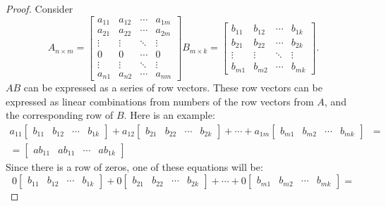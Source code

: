 \documentclass{article}
\begin{document}
\begin{question}{1.3}{}
{\begin{enumerate}
\begin{proof}
        Consider
        \[
          A_{n \times m} = \begin{bmatrix}
            a_{11} & a_{12} & \cdots & a_{1m} \\
            a_{21} & a_{22} & \cdots & a_{2m} \\
            \vdots & \vdots & \ddots & \vdots \\
            0      & 0      & \cdots & 0      \\
            \vdots & \vdots & \ddots & \vdots \\
            a_{n1} & a_{n2} & \cdots & a_{nm}
          \end{bmatrix}
          B_{m \times k} = \begin{bmatrix}
            b_{11} & b_{12} & \cdots & b_{1k} \\
            b_{21} & b_{22} & \cdots & b_{2k} \\
            \vdots & \vdots & \ddots & \vdots \\
            b_{m1} & b_{m2} & \cdots & b_{mk}
          \end{bmatrix}.
        \]
        $AB$ can be expressed as a series of row vectors. These row vectors can be expressed as linear combinations from numbers of the row vectors from $A$, and the corresponding row of $B$. Here is an example:
        \begin{align}
          a_{11}\begin{bmatrix} b_{11} & b_{12} & \cdots & b_{1k}\end{bmatrix} +
          a_{12}\begin{bmatrix} b_{21} & b_{22} & \cdots & b_{2k}\end{bmatrix} + \cdots +
          a_{1m}\begin{bmatrix} b_{m1} & b_{m2} & \cdots & b_{mk}\end{bmatrix} & = \\
          = \begin{bmatrix}ab_{11} & ab_{11} & \cdots & ab_{1k} \end{bmatrix}  &
        \end{align}
        Since there is a row of zeros, one of these equations will be:
        \[
          0\begin{bmatrix} b_{11} & b_{12} & \cdots & b_{1k}\end{bmatrix} +
          0\begin{bmatrix} b_{21} & b_{22} & \cdots & b_{2k}\end{bmatrix} + \cdots +
          0\begin{bmatrix} b_{m1} & b_{m2} & \cdots & b_{mk}\end{bmatrix} =
\]
\end{proof}
\end{enumerate}}
\end{question}
\end{document}
